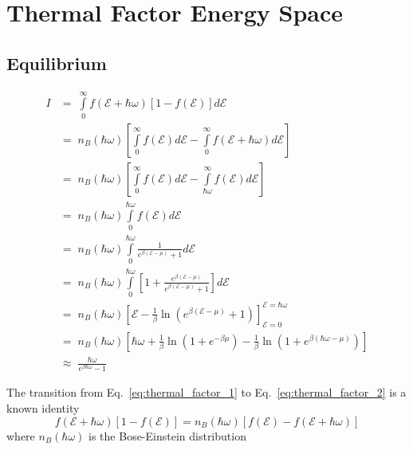 \newpage
\section{Thermal Factor Energy Space}
\label{app:thermal_factor_energy_space}

\subsection{Equilibrium}
\begin{align}
I & = \; \int\limits_{0}^{\infty} f(\mathcal{E}+\hbar\omega)[1-f(\mathcal{E})]d\mathcal{E}
\label{eq:thermal_factor_1}\\
&= \; n_{B}(\hbar \omega) \left[ \int\limits_{0}^{\infty}f(\mathcal{E})d\mathcal{E}-\int\limits_{0}^{\infty}f(\mathcal{E}+\hbar\omega) d\mathcal{E}\right]
\label{eq:thermal_factor_2}\\
&= \; n_{B}(\hbar \omega) \left[ \int\limits_{0}^{\infty}f(\mathcal{E})d\mathcal{E}-\int\limits_{\hbar\omega}^{\infty}f(\mathcal{E}) d\mathcal{E}\right]
\label{eq:thermal_factor_3}\\
&= \; n_{B}(\hbar \omega) \int\limits_{0}^{\hbar\omega}f(\mathcal{E})d\mathcal{E}
\label{eq:thermal_factor_4}\\
&= \; n_{B}(\hbar \omega) \int\limits_{0}^{\hbar\omega} \frac{1}{e^{\beta(\mathcal{E}-\mu)}+1}d\mathcal{E}
\label{eq:thermal_factor_5}\\
&= \; n_{B}(\hbar \omega) \int\limits_{0}^{\hbar\omega} \left[ 1+ \frac{e^{\beta(\mathcal{E}-\mu)}}{e^{\beta(\mathcal{E}-\mu)}+1} \right] d\mathcal{E}
\label{eq:thermal_factor_6}\\
&= \; n_{B}(\hbar \omega) \left[ \mathcal{E}- \frac{1}{\beta}\ln \left(e^{\beta(\mathcal{E}-\mu)}+1\right) \right]_{\mathcal{E=0}}^{\mathcal{E}=\hbar\omega}
\label{eq:thermal_factor_7}\\
&= \; n_{B}(\hbar \omega)  \left[ \hbar\omega+ \frac{1}{\beta}\ln\left(1+e^{-\beta\mu}\right)-\frac{1}{\beta}\ln\left(1+e^{\beta(\hbar\omega-\mu)}\right) \right]
\label{eq:thermal_factor_8}\\
& \approx \; \frac{\hbar\omega}{e^{\beta \hbar\omega}-1}
\label{eq:thermal_factor_9}
\end{align}

The transition from Eq.~\eqref{eq:thermal_factor_1} to Eq.~\eqref{eq:thermal_factor_2} is a known identity
\begin{equation}
f(\mathcal{E}+\hbar\omega) [1-f(\mathcal{E})] = n_{B}(\hbar\omega) \left[f(\mathcal{E})-f(\mathcal{E+\hbar \omega})\right]
\label{eq:thermal_factor_identity}
\end{equation}
where $n_{B}(\hbar\omega)$ is the Bose-Einstein distribution

